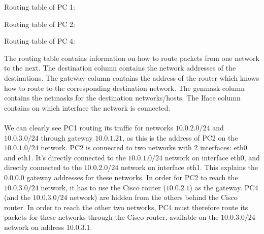 Routing table of PC 1:


Routing table of PC 2:


Routing table of PC 4:


The routing table contains information on how to route packets from one network to the next. The destination column contains the network addresses of the destinations. The gateway column contains the address of the router which knows how to route to the corresponding destination network. The genmask column contains the netmasks for the destination networks/hosts. The Iface column contains on which interface the network is connected.\\\\
We can clearly see PC1 routing its traffic for networks $10.0.2.0 / 24$ and $10.0.3.0 / 24$ through gateway $10.0.1.21$, as this is the address of PC2 on the $10.0.1.0 / 24$ network. PC2 is connected to two networks with 2 interfaces: eth0 and eth1. It's directly connected to the $10.0.1.0 / 24$ network on interface eth0, and directly connected to the $10.0.2.0 / 24$ network on interface eth1. This explains the $0.0.0.0$ gateway addresses for these networks. In order for PC2 to reach the $10.0.3.0 / 24$ network, it has to use the Cisco router ($10.0.2.1$) as the gateway. PC4 (and the $10.0.3.0 / 24$ network) are hidden from the others behind the Cisco router. In order to reach the other two networks, PC4 must therefore route its packets for these networks through the Cisco router, available on the $10.0.3.0 / 24$ network on address $10.0.3.1$.